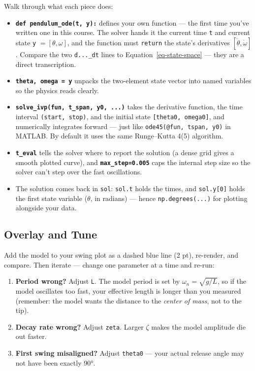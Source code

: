 \documentclass[
  12pt,
  letterpaper,
]{article}
\providecommand{\tightlist}{%
  \setlength{\itemsep}{0pt}\setlength{\parskip}{0pt}}
\begin{document}
Walk through what each piece does:

\begin{itemize}
\tightlist
\item
  \textbf{\texttt{def\ pendulum\_ode(t,\ y):}} defines your own function
  --- the first time you've written one in this course. The solver hands
  it the current time \texttt{t} and current state \texttt{y}
  \(= [\theta, \omega]\), and the function must \texttt{return} the
  state's derivatives \([\dot\theta, \dot\omega]\). Compare the two
  \texttt{d...\_dt} lines to Equation~\ref{eq-state-space} --- they are
  a direct transcription.
\item
  \textbf{\texttt{theta,\ omega\ =\ y}} unpacks the two-element state
  vector into named variables so the physics reads clearly.
\item
  \textbf{\texttt{solve\_ivp(fun,\ t\_span,\ y0,\ ...)}} takes the
  derivative function, the time interval \texttt{(start,\ stop)}, and
  the initial state \texttt{{[}theta0,\ omega0{]}}, and numerically
  integrates forward --- just like \texttt{ode45(@fun,\ tspan,\ y0)} in
  MATLAB. By default it uses the same Runge--Kutta 4(5) algorithm.
\item
  \textbf{\texttt{t\_eval}} tells the solver where to report the
  solution (a dense grid gives a smooth plotted curve), and
  \textbf{\texttt{max\_step=0.005}} caps the internal step size so the
  solver can't step over the fast oscillations.
\item
  The solution comes back in \texttt{sol}: \texttt{sol.t} holds the
  times, and \texttt{sol.y{[}0{]}} holds the first state variable
  (\(\theta\), in radians) --- hence \texttt{np.degrees(...)} for
  plotting alongside your data.
\end{itemize}

\subsection{Overlay and Tune}\label{overlay-and-tune}

Add the model to your swing plot as a dashed blue line (2 pt),
re-render, and compare. Then iterate --- change one parameter at a time
and re-run:

\begin{enumerate}
\def\labelenumi{\arabic{enumi}.}
\tightlist
\item
  \textbf{Period wrong?} Adjust \texttt{L}. The model period is set by
  \(\omega_n = \sqrt{g/L}\), so if the model oscillates too fast, your
  effective length is longer than you measured (remember: the model
  wants the distance to the \emph{center of mass}, not to the tip).
\item
  \textbf{Decay rate wrong?} Adjust \texttt{zeta}. Larger \(\zeta\)
  makes the model amplitude die out faster.
\item
  \textbf{First swing misaligned?} Adjust \texttt{theta0} --- your
  actual release angle may not have been exactly 90°.
\end{enumerate}
\end{document}
